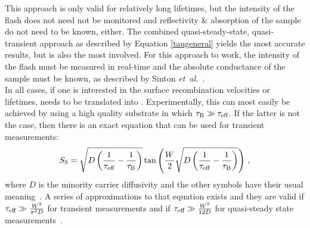 This approach is only valid for relatively long lifetimes, but the intensity of the flash does not need not be monitored and reflectivity \& absorption of the sample do not need to be known, either. The combined quasi-steady-state, quasi-transient approach as described by Equation \eqref{taugeneral} yields the most accurate results, but is also the most involved. For this approach to work, the intensity of the flash must be measured in real-time and the absolute conductance of the sample must be known, as described by Sinton \emph{et~al.}~\cite{sinton1,sinton2}.\\
In all cases, if one is interested in the surface recombination velocities or lifetimes, \teff{} needs to be translated into \tbulk{}. Experimentally, this can most easily be achieved by using a high quality substrate in which $\tau_{\text{B}} \gg \tau_{\text{eff}}$. If the latter is not the case, then there is an exact equation that can be used for transient measurements:
\begin{equation}
\label{exacttransient}
	S_{\text{S}} = \sqrt{D \left( \frac{1}{\tau_{\text{eff}}} - \frac{1}{\tau_{\text{B}}} \right)} \tan \left( \frac{W}{2} \sqrt{D \left( \frac{1}{\tau_{\text{eff}}} - \frac{1}{\tau_{\text{B}}} \right)} \right) \, ,
\end{equation}
where $D$ is the minority carrier diffusivity and the other symbols have their usual meaning~\cite{luke_lifetime}. A series of approximations to that equation exists and they are valid if $\tau_{\text{eff}} \gg \frac{W^2}{\pi ^2 D}$ for transient measurements and if $\tau_{\text{eff}} \gg \frac{W^2}{12 D}$ for quasi-steady state measurements~\cite{sproul_lifetime}. 

